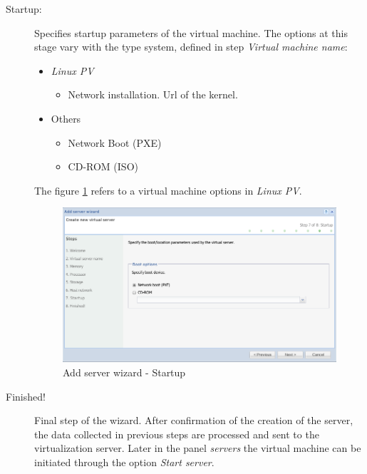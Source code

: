\begin{description}
        \item[Startup:] Specifies startup parameters of the virtual machine. The options at this stage vary with the type system, defined in step \emph{Virtual machine name}:		\label{sec:add_server_boot}
        \begin{itemize}
			\item \emph{Linux PV}
				\begin{itemize}
					\item Network installation. Url of the kernel.
				\end{itemize}
			\item Others
				\begin{itemize}
					\item Network Boot (PXE)
					\item CD-ROM (ISO)
				\end{itemize}
		\end{itemize}
        The figure \ref{fig:server_createwiz_startup} refers to a virtual machine options in \emph{Linux PV}.

		\begin{figure}[H]
			\begin{center}
			\includegraphics[scale=0.5]{screenshots/server_createwiz_startup.png}
			\caption{Add server wizard - Startup}
			\label{fig:server_createwiz_startup}
			\end{center}
		\end{figure}

	\item[Finished!] Final step of the wizard. After confirmation of the creation of the server, the data collected in previous steps are processed and sent to the virtualization server. Later in the panel \emph{servers} the virtual machine can be initiated through the option \emph{Start server}.


\end{description}
